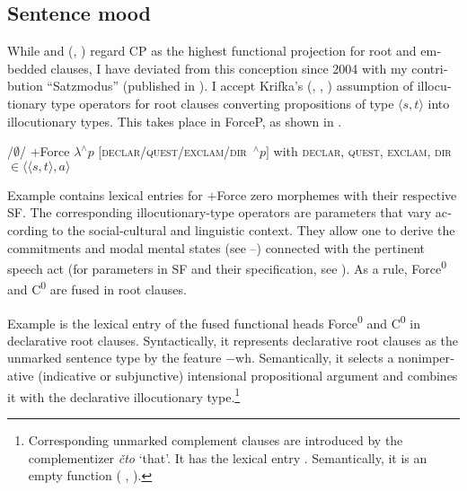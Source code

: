 \documentclass[output=paper,colorlinks,citecolor=brown]{langscibook}
\begin{document}
\begin{otherlanguage}{english}
\subsection{Sentence mood} \label{sentencemood}

While \textcite{Brandt-Reis-etal1992} and \citeauthor{Reis1997} (\citeyear{Reis1997}, \citeyear{Reis1999}) regard CP as the highest functional projection for root and embedded clauses, I have deviated from this conception since 2004 with my contribution ``Satzmodus'' (published in \citeyear{Zimmermann2009}). I accept Krifka's (\citeyear{Krifka2001}, \citeyear{Krifka2004}, \citeyear{Krifka2013}) assumption of illocutionary type operators for root clauses converting propositions of type $\langle s, t \rangle$ into illocutionary types. This takes place in ForceP, as shown in .

\begin{exe}
\ex	\label{ex:16:9}
\begin{xlist}
	\ex /$\emptyset$/
    \ex +Force 
    \ex $\lambda ^{\wedge}p  $ [\textsc{declar/quest/exclam/dir} $ \, ^{\wedge}p ]$ \newline
    with \textsc{declar, quest, exclam, dir} $\in \langle\langle s, t \rangle, a\rangle $
\end{xlist}
\end{exe}

\noindent Example   contains lexical entries for $+$Force zero morphemes with their respective SF. The corresponding illocutionary-type operators are parameters that vary according to the social-cultural and linguistic context. They allow one to derive the commitments and modal mental states (see --) connected with the pertinent speech act (for parameters in SF and their specification, see \citealt{Dolling1997}). As a rule, Force\textsuperscript{0} and C\textsuperscript{0} are fused in root clauses.

Example  is the lexical entry of the fused functional heads Force\textsuperscript{0} and C\textsuperscript{0} in declarative root clauses. Syntactically, it represents declarative root clauses as the unmarked sentence type by the feature $-$wh. Semantically, it selects a nonimperative (indicative or subjunctive) intensional propositional argument and combines it with the declarative illocutionary type.\footnote{Corresponding unmarked complement clauses are introduced by the complementizer \textit{čto} `that'. It has the lexical entry . Semantically, it is an empty function (\citeauthor{Zimmermann2015a} \citeyear{Zimmermann2015a}, \citeyear{Zimmermann2016}).

}
\end{otherlanguage}
\end{document}
